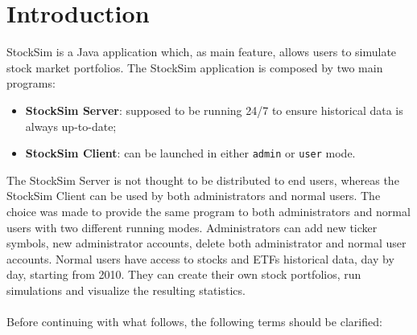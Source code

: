 \chapter{Introduction}
StockSim is a Java application which, as main feature, allows users to simulate 
stock market portfolios. The StockSim application is composed by two main 
programs:
\begin{itemize}
    \item \textbf{StockSim Server}: supposed to be running 24/7 to ensure 
            historical data is always up-to-date;
    \item \textbf{StockSim Client}: can be launched in either \texttt{admin} or 
            \texttt{user} mode.
\end{itemize}
The StockSim Server is not thought to be distributed to end users, whereas the 
StockSim Client can be used by both administrators and normal users. The choice 
was made to provide the same program to both administrators and normal users 
with two different running modes. Administrators can add new ticker symbols, 
new administrator accounts, delete both administrator and normal user accounts. 
Normal users have access to stocks and ETFs historical data, day by day, 
starting from 2010. They can create their own stock portfolios, run simulations 
and visualize the resulting statistics.\\
\\
Before continuing with what follows, the following terms should be clarified:
